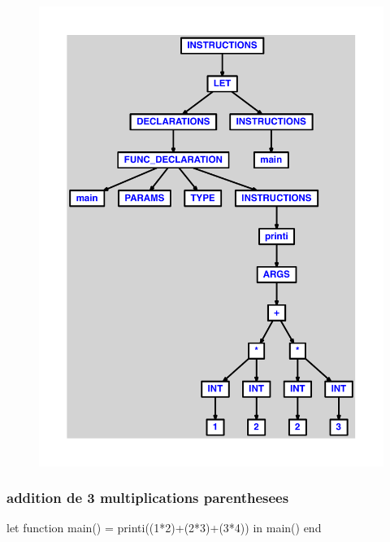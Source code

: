 \documentclass{article}
\begin{document}
\begin{figure}[H]\centering\includegraphics[max width=\textwidth]{ast/ast_107.pdf}\end{figure}\subsubsection{addition de 3 multiplications parenthesees}
\begin{verbatimtab}
let function main() = printi((1*2)+(2*3)+(3*4)) in main() end
\end{verbatimtab}
\end{document}
